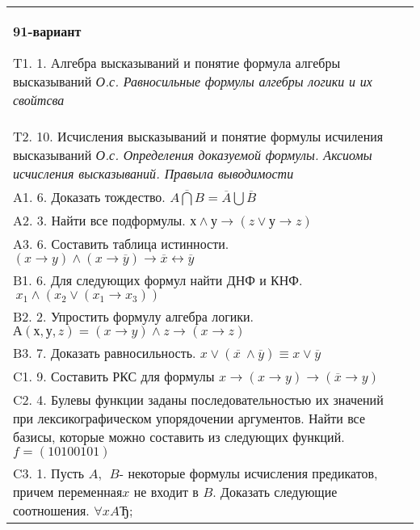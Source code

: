 \documentclass{article}
\begin{document}
\begin{tabular}{m{17cm}}
\textbf{91-вариант}
\newline

T1. 1. Алгебра высказываний и понятие формула алгебры высказываний \emph{О.с. Равносильные формулы алгебры логики и их свойтсва} \\
T2. 10. Исчисления высказываний и понятие формулы исчиления высказываний \emph{О.с. Определения доказуемой формулы. Аксиомы исчисления высказываний. Правыла выводимости} \\
A1. 6. Доказать тождество. \(\overline{A\bigcap B} = \overline{A}\bigcup\overline{B}\) \\
A2. 3. Найти все подформулы. \(х \land у \rightarrow (z \vee у \rightarrow z)\) \\
A3. 6. Составить таблица истинности. \((x \rightarrow y) \land (x \rightarrow \overline{y}) \rightarrow \overline{x} \leftrightarrow \overline{y}\) \\
B1. 6. Для следующих формул найти ДНФ и КНФ. \(\ x_{1} \land (x_{2} \vee (x_{1} \rightarrow x_{3}))\) \\
B2. 2. Упростить формулу алгебра логики. \(А(х,у,z) = (x \rightarrow y) \land z \rightarrow (x \rightarrow z)\) \\
B3. 7. Доказать равносильность. \(x \vee \left( \overline{x\ } \land \overline{y} \right) \equiv x \vee \overline{y}\) \\
C1. 9. Составить РКС для формулы \(x \rightarrow (x \rightarrow y) \rightarrow (\overline{x} \rightarrow y)\ \) \\
C2. 4. Булевы функции заданы последовательностью их значений при лексикографическом упорядочении аргументов. Найти все базисы, которые можно составить из следующих функций. \(f = (10100101)\) \\
C3. 1. Пусть \(A,\ \ B\)- некоторые формулы исчисления предикатов, причем переменная\(x\) не входит в \(B\). Доказать следующие соотношения. \(\forall xAЂ\); \\

\end{tabular}
\vspace{1cm}
\end{document}

